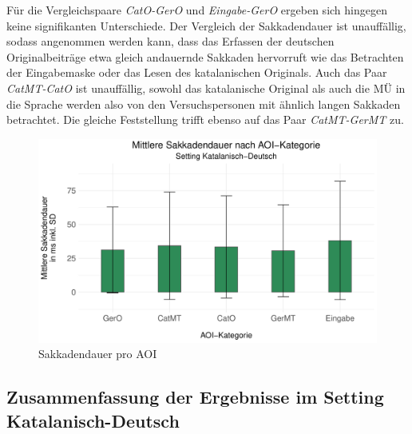 
Für die Vergleichspaare \emph{CatO-GerO} und \emph{Eingabe-GerO} ergeben sich hingegen keine signifikanten Unterschiede. Der Vergleich der Sakkadendauer ist unauffällig, sodass angenommen werden kann, dass das Erfassen der deutschen Originalbeiträge etwa gleich andauernde Sakkaden hervorruft wie das Betrachten der Eingabemaske oder das Lesen des katalanischen Originals. Auch das Paar \emph{CatMT-CatO} ist unauffällig, sowohl das katalanische Original als auch die MÜ in die Sprache werden also von den Versuchspersonen mit ähnlich langen Sakkaden betrachtet. Die gleiche Feststellung trifft ebenso auf das Paar \emph{CatMT-GerMT} zu.


\begin{figure}
    \includegraphics[width=\textwidth]{Figures/EyeTracking/CatDe/ggplot_boxplot_sacdur_AOI_de}
	\caption{Sakkadendauer pro AOI\label{K6:fig:CatDe:sacdur-mean}}
\end{figure}



\subsection{Zusammenfassung der Ergebnisse im Setting Katalanisch-Deutsch}
\label{K6:subsec:resumee:CatDe}


